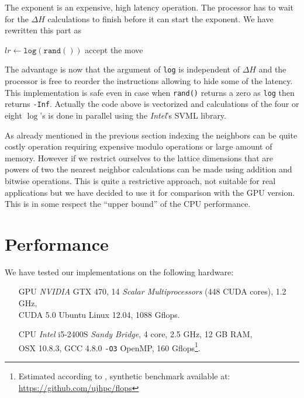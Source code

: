 \documentclass[a4paper]{llncs}
\begin{document}
The exponent is an expensive, high latency operation. The processor has to wait
for the $\Delta H$ calculations to finish before it can start the exponent. We
have rewritten this part as

\begin{algorithmic}[1]
  \State $lr \gets \mathtt{log}(\mathtt{rand}())$
    \State accept the move
  \EndIf
\EndFor
\end{algorithmic}

The advantage is now that the argument of \texttt{log} is independent of
$\Delta H$ and the processor is free to reorder the instructions allowing to
hide some of the latency. This implementation is safe even in case when
\texttt{rand()} returns a zero as \texttt{log} then returns \texttt{-Inf}.
Actually the code above is vectorized and calculations of the four or eight
$\log$'s is done in parallel using the \emph{Intel}'s SVML library\cite{svml}.

As already mentioned in the previous section indexing the neighbors can be
quite costly operation requiring expensive modulo operations or large amount of
memory. However if we restrict ourselves to the lattice dimensions that are
powers of two the nearest neighbor calculations can be made using addition and
bitwise operations. This is quite a restrictive approach, not suitable for real
applications but we have decided to use it for comparison with the GPU version.
This is in some respect the ``upper bound'' of the CPU performance.


\section{Performance}
\label{sec:performance}

We have tested our implementations on the following hardware:
\begin{itemize}

\item[GPU] \emph{NVIDIA} GTX 470, 14 \emph{Scalar Multiprocessors}
(448 CUDA cores), 1.2 GHz, \\
CUDA 5.0 Ubuntu Linux 12.04, 1088 Gflops.

\vspace{.5em}

\item[CPU] \emph{Intel} i5-2400S \emph{Sandy Bridge}, 4 core, 2.5 GHz, 12 GB
RAM, \\
OSX 10.8.3, GCC 4.8.0 \verb!-O3! OpenMP, 160 Gflops\footnote{Estimated
according to \cite{intel}, synthetic benchmark available at: \\
\url{https://github.com/ujhpc/flops}}.

\end{itemize}
\end{document}
